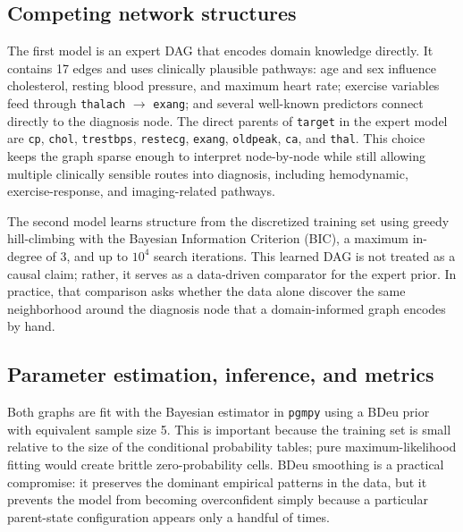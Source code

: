 \documentclass[10pt,twocolumn]{article}
\begin{document}
\subsection{Competing network structures}
The first model is an expert DAG that encodes domain knowledge directly. It contains 17 edges and uses clinically plausible pathways: age and sex influence cholesterol, resting blood pressure, and maximum heart rate; exercise variables feed through \texttt{thalach} $\rightarrow$ \texttt{exang}; and several well-known predictors connect directly to the diagnosis node. The direct parents of \texttt{target} in the expert model are \texttt{cp}, \texttt{chol}, \texttt{trestbps}, \texttt{restecg}, \texttt{exang}, \texttt{oldpeak}, \texttt{ca}, and \texttt{thal}. This choice keeps the graph sparse enough to interpret node-by-node while still allowing multiple clinically sensible routes into diagnosis, including hemodynamic, exercise-response, and imaging-related pathways.

The second model learns structure from the discretized training set using greedy hill-climbing with the Bayesian Information Criterion (BIC), a maximum in-degree of 3, and up to $10^4$ search iterations. This learned DAG is not treated as a causal claim; rather, it serves as a data-driven comparator for the expert prior. In practice, that comparison asks whether the data alone discover the same neighborhood around the diagnosis node that a domain-informed graph encodes by hand.

\subsection{Parameter estimation, inference, and metrics}
Both graphs are fit with the Bayesian estimator in \texttt{pgmpy} using a BDeu prior with equivalent sample size 5. This is important because the training set is small relative to the size of the conditional probability tables; pure maximum-likelihood fitting would create brittle zero-probability cells. BDeu smoothing is a practical compromise: it preserves the dominant empirical patterns in the data, but it prevents the model from becoming overconfident simply because a particular parent-state configuration appears only a handful of times.
\end{document}
